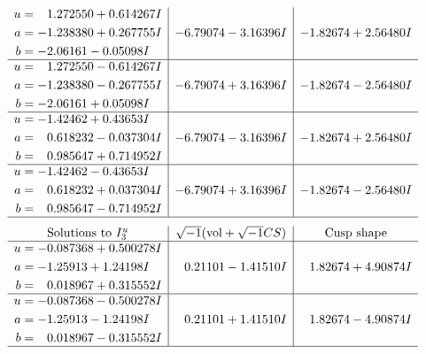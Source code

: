 \documentclass[1p]{elsarticle_modified}
\theoremstyle{definition}
\newcommand{\I}{\sqrt{-1}}
\begin{document}
$$\begin{array}{c|c|c}
\begin{aligned}
u &= \phantom{-}1.272550 + 0.614267 I \\
a &= -1.238380 + 0.267755 I \\
b &= -2.06161 - 0.05098 I\end{aligned}
 & -6.79074 - 3.16396 I & -1.82674 + 2.56480 I \\ \hline\begin{aligned}
u &= \phantom{-}1.272550 - 0.614267 I \\
a &= -1.238380 - 0.267755 I \\
b &= -2.06161 + 0.05098 I\end{aligned}
 & -6.79074 + 3.16396 I & -1.82674 - 2.56480 I \\ \hline\begin{aligned}
u &= -1.42462 + 0.43653 I \\
a &= \phantom{-}0.618232 - 0.037304 I \\
b &= \phantom{-}0.985647 + 0.714952 I\end{aligned}
 & -6.79074 - 3.16396 I & -1.82674 + 2.56480 I \\ \hline\begin{aligned}
u &= -1.42462 - 0.43653 I \\
a &= \phantom{-}0.618232 + 0.037304 I \\
b &= \phantom{-}0.985647 - 0.714952 I\end{aligned}
 & -6.79074 + 3.16396 I & -1.82674 - 2.56480 I\\
 \hline 
 \end{array}$$\newpage$$\begin{array}{c|c|c}  
\text{Solutions to }I^u_{3}& \I (\text{vol} + \sqrt{-1}CS) & \text{Cusp shape}\\
 \hline 
\begin{aligned}
u &= -0.087368 + 0.500278 I \\
a &= -1.25913 + 1.24198 I \\
b &= \phantom{-}0.018967 + 0.315552 I\end{aligned}
 & \phantom{-}0.21101 - 1.41510 I & \phantom{-}1.82674 + 4.90874 I \\ \hline\begin{aligned}
u &= -0.087368 - 0.500278 I \\
a &= -1.25913 - 1.24198 I \\
b &= \phantom{-}0.018967 - 0.315552 I\end{aligned}
 & \phantom{-}0.21101 + 1.41510 I & \phantom{-}1.82674 - 4.90874 I\\
 \hline 
 \end{array}$$\newpage\newpage\renewcommand{\arraystretch}{1}
\end{document}
